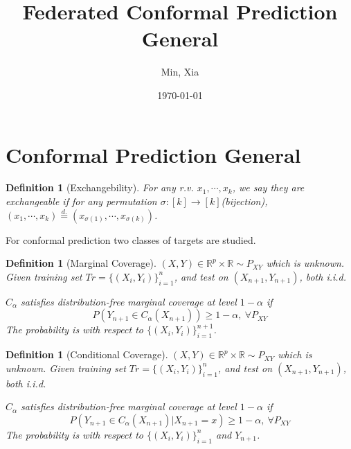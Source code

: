 \documentclass[12pt, a4paper, oneside]{article}
\title{\textbf{Federated Conformal Prediction General}}
\author{Min, Xia}
\date{\today}
\newtheorem{definition}[theorem]{Definition}
\begin{document}
\maketitle
\setcounter{page}{1}
\section[Section title sans citation]{Conformal Prediction General\cite{angelopoulos2023conformal}}
    \begin{definition}[Exchangebility]\cite{shafer2008tutorial}
        For any r.v. $x_1,\cdots,x_k$, we say they are exchangeable if for any permutation $\sigma:[k]\rightarrow[k]$(bijection), $(x_1,\cdots,x_k)\overset{d.}{=}(x_{\sigma(1)},\cdots,x_{\sigma(k)})$.
    \end{definition}


    For conformal prediction two classes of targets are studied.
    \begin{definition}[Marginal Coverage]
        $(X,Y)\in\mathbb{R}^p\times\mathbb{R}\sim P_{XY}$ which is unknown. Given training set $Tr=\{(X_i,Y_i)\}_{i=1}^n$, and test on $(X_{n+1},Y_{n+1})$, both i.i.d.


        $C_\alpha$  satisfies distribution-free marginal coverage at level $1-\alpha$ if
        \begin{equation*}
            P(Y_{n+1}\in C_\alpha(X_{n+1}))\geq 1-\alpha,\ \forall P_{XY}
        \end{equation*}
        The probability is with respect to $\{(X_i,Y_i)\}_{i=1}^{n+1}$.
    \end{definition}


    \begin{definition}[Conditional Coverage]
        $(X,Y)\in\mathbb{R}^p\times\mathbb{R}\sim P_{XY}$ which is unknown. Given training set $Tr=\{(X_i,Y_i)\}_{i=1}^n$, and test on $(X_{n+1},Y_{n+1})$, both i.i.d.


        $C_\alpha$  satisfies distribution-free marginal coverage at level $1-\alpha$ if
        \begin{equation*}
            P(Y_{n+1}\in C_\alpha(X_{n+1})\Big|X_{n+1}=x)\geq 1-\alpha,\ \forall P_{XY}
        \end{equation*}
        The probability is with respect to $\{(X_i,Y_i)\}_{i=1}^n$ and $Y_{n+1}$.
    \end{definition}

\newpage


\end{document}
